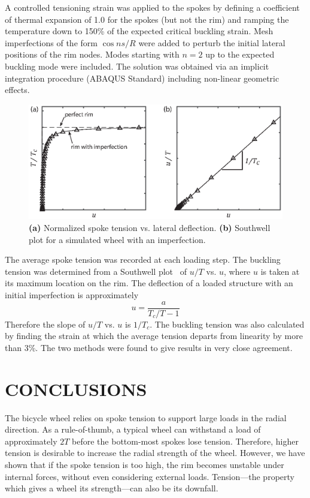 \documentclass{bmd2016p}
\begin{document}
A controlled tensioning strain was applied to the spokes by defining a coefficient of thermal expansion of 1.0 for the spokes (but not the rim) and ramping the temperature down to 150\% of the expected critical buckling strain. Mesh imperfections of the form $\cos{ns/R}$ were added to perturb the initial lateral positions of the rim nodes. Modes starting with $n=2$ up to the expected buckling mode were included. The solution was obtained via an implicit integration procedure (ABAQUS Standard) including non-linear geometric effects.

\begin{figure}[!ht]
\centering
\includegraphics[scale=1.0]{figures/bmd_figures-07.eps}
\caption{\textbf{(a)} Normalized spoke tension vs. lateral deflection. \textbf{(b)} Southwell plot for a simulated wheel with an imperfection.}
\label{fig:Southwell}
\end{figure}

The average spoke tension was recorded at each loading step. The buckling tension was determined from a Southwell plot~\cite{Timoshenko1961a} of $u/T$ vs. $u$, where $u$ is taken at its maximum location on the rim. The deflection of a loaded structure with an initial imperfection is approximately
	\begin{equation}\label{eq:Southwell}
	u = \frac{a}{T_c/T - 1}
	\end{equation}
Therefore the slope of $u/T$ vs. $u$ is $1/T_c$. The buckling tension was also calculated by finding the strain at which the average tension departs from linearity by more than 3\%. The two methods were found to give results in very close agreement.


\section{CONCLUSIONS}
The bicycle wheel relies on spoke tension to support large loads in the radial direction. As a rule-of-thumb, a typical wheel can withstand a load of approximately $2T$ before the bottom-most spokes lose tension. Therefore, higher tension is desirable to increase the radial strength of the wheel. However, we have shown that if the spoke tension is too high, the rim becomes unstable under internal forces, without even considering external loads. Tension---the property which gives a wheel its strength---can also be its downfall.
\end{document}
